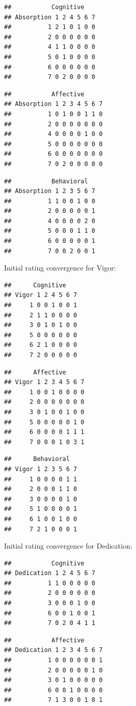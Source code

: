 \documentclass[
]{book}
\begin{document}
\begin{verbatim}
##           Cognitive
## Absorption 1 2 4 5 6 7
##          1 2 1 0 1 0 0
##          2 0 0 0 0 0 0
##          4 1 1 0 0 0 0
##          5 0 1 0 0 0 0
##          6 0 0 0 0 0 0
##          7 0 2 0 0 0 0
\end{verbatim}

\begin{verbatim}
##           Affective
## Absorption 1 2 3 4 5 6 7
##          1 0 1 0 0 1 1 0
##          2 0 0 0 0 0 0 0
##          4 0 0 0 0 1 0 0
##          5 0 0 0 0 0 0 0
##          6 0 0 0 0 0 0 0
##          7 0 2 0 0 0 0 0
\end{verbatim}

\begin{verbatim}
##           Behavioral
## Absorption 1 2 3 5 6 7
##          1 1 0 0 1 0 0
##          2 0 0 0 0 0 1
##          4 0 0 0 0 2 0
##          5 0 0 0 1 1 0
##          6 0 0 0 0 0 1
##          7 0 0 2 0 0 1
\end{verbatim}

Initial rating convergence for Vigor:

\begin{verbatim}
##      Cognitive
## Vigor 1 2 4 5 6 7
##     1 0 0 1 0 0 1
##     2 1 1 0 0 0 0
##     3 0 1 0 1 0 0
##     5 0 0 0 0 0 0
##     6 2 1 0 0 0 0
##     7 2 0 0 0 0 0
\end{verbatim}

\begin{verbatim}
##      Affective
## Vigor 1 2 3 4 5 6 7
##     1 0 0 1 0 0 0 0
##     2 0 0 0 0 0 0 0
##     3 0 1 0 0 1 0 0
##     5 0 0 0 0 0 1 0
##     6 0 0 0 0 1 1 1
##     7 0 0 0 1 0 3 1
\end{verbatim}

\begin{verbatim}
##      Behavioral
## Vigor 1 2 3 5 6 7
##     1 0 0 0 0 1 1
##     2 0 0 0 1 1 0
##     3 0 0 0 0 1 0
##     5 1 0 0 0 0 1
##     6 1 0 0 1 0 0
##     7 2 1 0 0 0 1
\end{verbatim}

Initial rating convergence for Dedication:

\begin{verbatim}
##           Cognitive
## Dedication 1 2 4 5 6 7
##          1 1 0 0 0 0 0
##          2 0 0 0 0 0 0
##          3 0 0 0 1 0 0
##          6 0 0 1 0 0 1
##          7 0 2 0 4 1 1
\end{verbatim}

\begin{verbatim}
##           Affective
## Dedication 1 2 3 4 5 6 7
##          1 0 0 0 0 0 0 1
##          2 0 0 0 0 0 1 0
##          3 0 1 0 0 0 0 0
##          6 0 0 1 0 0 0 0
##          7 1 3 0 0 1 0 1
\end{verbatim}
\end{document}
